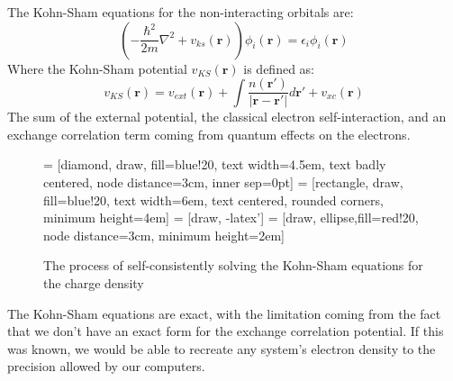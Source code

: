 \documentclass[12pt]{article}
\begin{document}
The Kohn-Sham equations for the non-interacting orbitals are:
\begin{equation}\label{eq:kohn-sham}
\left(-\frac{\hbar^2}{2m}\nabla^2 + v_{ks}(\mathbf r)\right)\phi_i(\mathbf r) = \epsilon_i \phi_i(\mathbf r)
\end{equation}
Where the Kohn-Sham potential $v_{KS}(\mathbf r)$ is defined as:
\begin{equation}\label{eq:kohn-shampotential}
v_{KS}(\mathbf r) = v_{ext}(\mathbf r) + \int \frac{n(\mathbf r')}{\left|\mathbf r - \mathbf {r'}\right|}d\mathbf {r'} + v_{xc}(\mathbf r)
\end{equation}
The sum of the external potential, the classical electron self-interaction, and an exchange correlation term coming from quantum effects on the electrons. 
\begin{figure}
\centering
	 = [diamond, draw, fill=blue!20, 
    text width=4.5em, text badly centered, node distance=3cm, inner sep=0pt]
 = [rectangle, draw, fill=blue!20, 
    text width=6em, text centered, rounded corners, minimum height=4em]
 = [draw, -latex']
 = [draw, ellipse,fill=red!20, node distance=3cm,
    minimum height=2em]
    
\caption{The process of self-consistently solving the Kohn-Sham equations for the charge density}
\end{figure}

The Kohn-Sham equations are exact, with the limitation coming from the fact that we don't have an exact form for the exchange correlation potential. If this was known, we would be able to recreate any system's electron density to the precision allowed by our computers.
\end{document}
